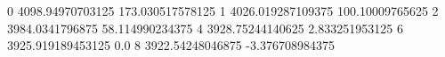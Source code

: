 0 4098.94970703125 173.030517578125
1 4026.019287109375 100.10009765625
2 3984.0341796875 58.114990234375
4 3928.75244140625 2.833251953125
6 3925.919189453125 0.0
8 3922.54248046875 -3.376708984375
